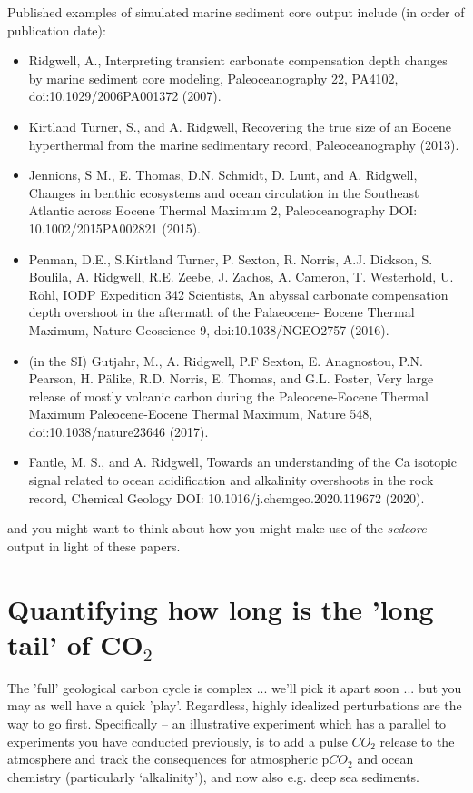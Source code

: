 Published examples of simulated marine sediment core output include (in order of publication date):
\begin{itemize}[noitemsep]
\item Ridgwell, A., Interpreting transient carbonate compensation depth changes by marine sediment core modeling, Paleoceanography 22, PA4102, doi:10.1029/2006PA001372 (2007).
\item Kirtland Turner, S., and A. Ridgwell, Recovering the true size of an Eocene hyperthermal from the marine sedimentary record, Paleoceanography (2013).
\item Jennions, S M., E. Thomas, D.N. Schmidt, D. Lunt, and A. Ridgwell, Changes in benthic ecosystems and ocean circulation in the Southeast Atlantic across Eocene Thermal Maximum 2, Paleoceanography DOI: 10.1002/2015PA002821 (2015).
\item Penman, D.E., S.Kirtland Turner, P. Sexton, R. Norris, A.J. Dickson, S. Boulila, A. Ridgwell, R.E. Zeebe, J. Zachos, A. Cameron, T. Westerhold, U. Röhl, IODP Expedition 342 Scientists, An abyssal carbonate compensation depth overshoot in the aftermath of the Palaeocene- Eocene Thermal Maximum, Nature Geoscience 9, doi:10.1038/NGEO2757 (2016).
\item (in the SI) Gutjahr, M., A. Ridgwell, P.F Sexton, E. Anagnostou, P.N. Pearson, H. Pälike, R.D. Norris, E. Thomas, and G.L. Foster, Very large release of mostly volcanic carbon during the Paleocene-Eocene Thermal Maximum Paleocene-Eocene Thermal Maximum, Nature 548, doi:10.1038/nature23646 (2017).
\item Fantle, M. S., and A. Ridgwell, Towards an understanding of the Ca isotopic signal related to ocean acidification and alkalinity overshoots in the rock record, Chemical Geology DOI: 10.1016/j.chemgeo.2020.119672 (2020).
\end{itemize}
and you might want to think about how you might make use of the \textit{sedcore} output in light of these papers.

\newpage

\section{Quantifying how long is the 'long tail' of CO$_{2}$}

The 'full' geological carbon cycle is complex ... we'll pick it apart soon ... but you may as well have a quick 'play'. Regardless, highly idealized perturbations are the way to go first. Specifically -- an illustrative experiment which has a parallel to experiments you have conducted previously, is to add a pulse \(CO_{2}\) release to the atmosphere and track the consequences for atmospheric p\(CO_{2}\) and ocean chemistry (particularly ‘alkalinity’), and now also e.g. deep sea sediments. 


